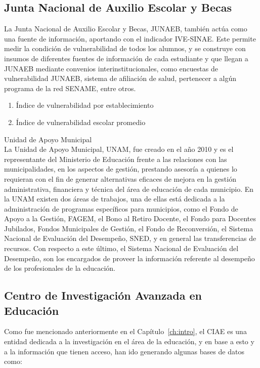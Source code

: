\subsection{Junta Nacional de Auxilio Escolar y Becas}
La Junta Nacional de Auxilio Escolar y Becas, JUNAEB, también actúa como una fuente de información, aportando con el indicador IVE-SINAE. Este permite medir la condición de vulnerabilidad de todos los alumnos, y se construye con insumos de diferentes fuentes de información de cada estudiante y que llegan a JUNAEB mediante convenios interinstitucionales, como encuestas de vulnerabilidad JUNAEB, sistema de afiliación de salud, pertenecer a algún programa de la red SENAME, entre otros. 

\begin{enumerate}
\item Índice de vulnerabilidad por establecimiento
\item Índice de vulnerabilidad escolar promedio
\end{enumerate}

\begin{longdescription}
\item [Unidad de Apoyo Municipal] \hfill \\
La Unidad de Apoyo Municipal, UNAM, fue creado en el año 2010 y es el representante del Ministerio de Educación frente a las relaciones con las municipalidades, en los aspectos de gestión, prestando asesoría a quienes lo requieran con el fin de generar alternativas eficaces de mejora en la gestión administrativa, financiera y técnica del área de educación de cada municipio.
En la UNAM existen dos áreas de trabajos, una de ellas está dedicada a la administración de programas específicos para municipios, como el Fondo de Apoyo a la Gestión, FAGEM, el Bono al Retiro Docente, el Fondo para Docentes Jubilados, Fondos Municipales de Gestión, el Fondo de Reconversión, el Sistema Nacional de Evaluación del Desempeño, SNED, y en general las transferencias de recursos.  
Con respecto a este último, el Sistema Nacional de Evaluación del Desempeño, son los encargados de proveer la información referente al desempeño de los profesionales de la educación. 
\end{longdescription}

\subsection{Centro de Investigación Avanzada en Educación}
Como fue mencionado anteriormente en el Capítulo~\ref{ch:intro}, el CIAE es una entidad dedicada a la investigación en el área de la educación, y en base a esto y a la información que tienen acceso, han ido generando algunas bases de datos como:

